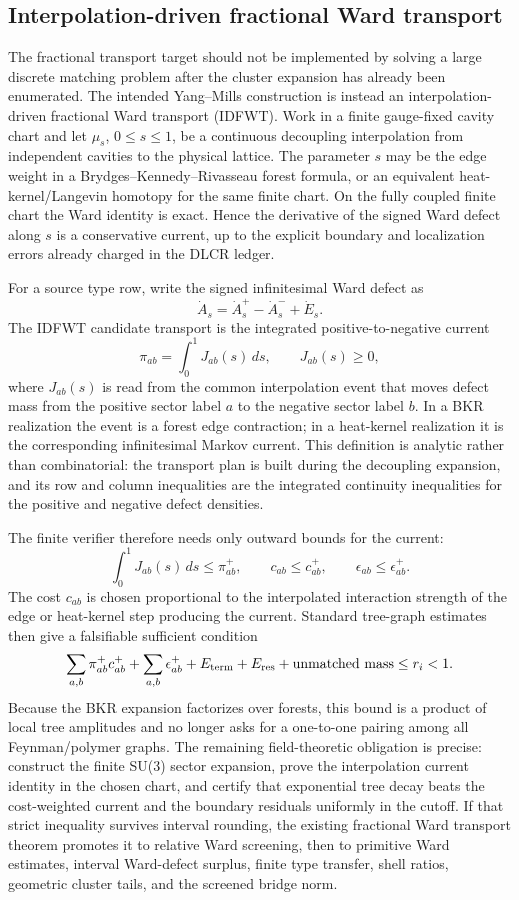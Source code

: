 \subsection{Interpolation-driven fractional Ward transport}
The fractional transport target should not be implemented by solving a
large discrete matching problem after the cluster expansion has already been
enumerated.  The intended Yang--Mills construction is instead an
interpolation-driven fractional Ward transport (IDFWT).  Work in a finite
gauge-fixed cavity chart and let $\mu_s$, $0\le s\le 1$, be a continuous
decoupling interpolation from independent cavities to the physical lattice.
The parameter $s$ may be the edge weight in a Brydges--Kennedy--Rivasseau
forest formula, or an equivalent heat-kernel/Langevin homotopy for the same
finite chart.  On the fully coupled finite chart the Ward identity is exact.
Hence the derivative of the signed Ward defect along $s$ is a conservative
current, up to the explicit boundary and localization errors already charged
in the DLCR ledger.

For a source type row, write the signed infinitesimal Ward defect as
\[
  \dot A_s=\dot A_s^+-\dot A_s^-+\dot E_s .
\]
The IDFWT candidate transport is the integrated positive-to-negative current
\[
  \pi_{ab}=\int_0^1 J_{ab}(s)\,ds,\qquad J_{ab}(s)\ge0,
\]
where $J_{ab}(s)$ is read from the common interpolation event that moves
defect mass from the positive sector label $a$ to the negative sector label
$b$.  In a BKR realization the event is a forest edge contraction; in a
heat-kernel realization it is the corresponding infinitesimal Markov current.
This definition is analytic rather than combinatorial: the transport plan is
built during the decoupling expansion, and its row and column inequalities are
the integrated continuity inequalities for the positive and negative defect
densities.

The finite verifier therefore needs only outward bounds for the current:
\[
  \int_0^1 J_{ab}(s)\,ds\le \pi_{ab}^+,\qquad
  c_{ab}\le c_{ab}^+,\qquad
  \epsilon_{ab}\le \epsilon_{ab}^+ .
\]
The cost $c_{ab}$ is chosen proportional to the interpolated interaction
strength of the edge or heat-kernel step producing the current.  Standard
tree-graph estimates then give a falsifiable sufficient condition
\[
  \sum_{a,b}\pi_{ab}^+c_{ab}^+
  +\sum_{a,b}\epsilon_{ab}^+
  +E_{\rm term}+E_{\rm res}
  +\hbox{unmatched mass}
  \le r_i<1 .
\]
Because the BKR expansion factorizes over forests, this bound is a product of
local tree amplitudes and no longer asks for a one-to-one pairing among all
Feynman/polymer graphs.  The remaining field-theoretic obligation is precise:
construct the finite SU(3) sector expansion, prove the interpolation current
identity in the chosen chart, and certify that exponential tree decay beats
the cost-weighted current and the boundary residuals uniformly in the cutoff.
If that strict inequality survives interval rounding, the existing fractional
Ward transport theorem promotes it to relative Ward screening, then to
primitive Ward estimates, interval Ward-defect surplus, finite type transfer,
shell ratios, geometric cluster tails, and the screened bridge norm.

